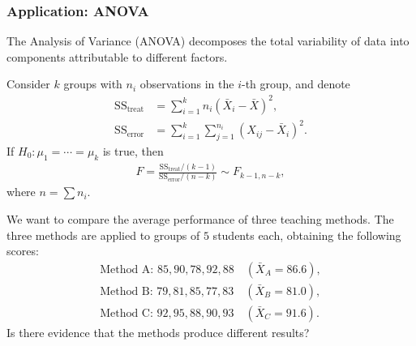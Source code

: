 \subsubsection{Application: ANOVA}

The Analysis of Variance (ANOVA) decomposes the total variability of data into components attributable to different factors.

\begin{teorema}
Consider $k$ groups with $n_i$ observations in the $i$-th group, and denote
\begin{align}
 \text{SS}_{\text{treat}} &= \sum_{i=1}^k n_i (\bar{X}_i - \bar{X})^2, \\
 \text{SS}_{\text{error}} &= \sum_{i=1}^k \sum_{j=1}^{n_i} (X_{ij} - \bar{X}_i)^2.
\end{align}
If $H_0: \mu_1 = \cdots = \mu_k$ is true, then
\begin{align}
 \label{eq:3.2.18}
 F = \frac{\text{SS}_{\text{treat}}/(k-1)}{\text{SS}_{\text{error}}/(n-k)} \sim F_{k-1, n-k},
\end{align}
where $n = \sum n_i$.
\end{teorema}

\begin{ejemplo}
 \label{exmp:3.2.6}
We want to compare the average performance of three teaching methods. The three methods are applied to groups of $5$ students each, obtaining the following scores:
\begin{align}
 \text{Method A: } 85, 90, 78, 92, 88 \quad (\bar{X}_A = 86.6), \\
 \text{Method B: } 79, 81, 85, 77, 83 \quad (\bar{X}_B = 81.0), \\
 \text{Method C: } 92, 95, 88, 90, 93 \quad (\bar{X}_C = 91.6).
\end{align}
Is there evidence that the methods produce different results?
\end{ejemplo}

